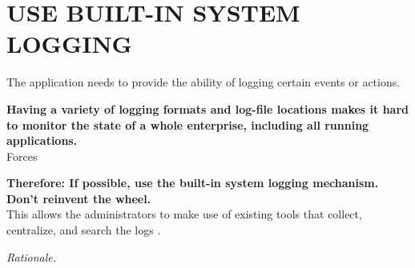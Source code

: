 \newpage
\section*{USE BUILT-IN SYSTEM LOGGING}

The application needs to provide the ability of logging certain events or actions.\\ 

\begin{center}
  
\end{center}

\textbf{Having a variety of logging formats and log-file locations makes it hard to monitor the state of a whole enterprise, including all running applications.}\\

Forces

\begin{center}
   
\end{center}

\textbf{Therefore: If possible, use the built-in system logging mechanism. Don't reinvent the wheel.}\\

This allows the administrators to make use of existing tools that collect, centralize, and search the logs \cite{Limoncelli2011a}.\\

\begin{center}
   
\end{center}

\textit{Rationale.}
